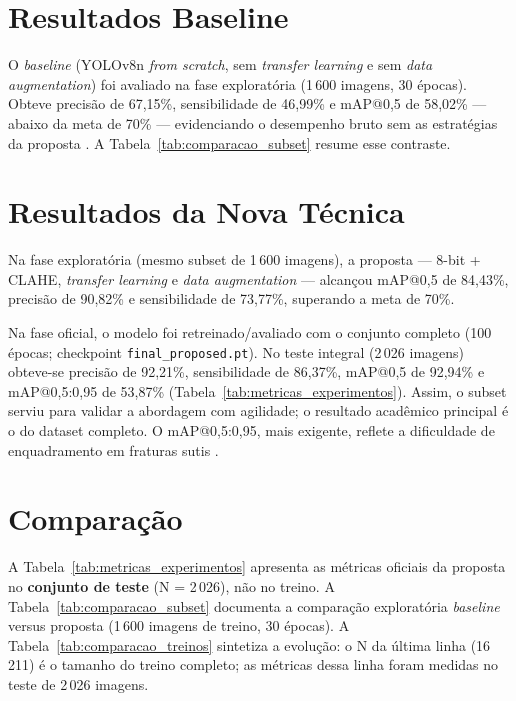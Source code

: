 \documentclass[12pt,oneside,a4paper,chapter=TITLE,section=TITLE,sumario=tradicional]{abntex2}
\begin{document}
\section{Resultados Baseline}
\label{sec:resultados_baseline}

O \textit{baseline} (YOLOv8n \textit{from scratch}, sem \textit{transfer learning} e sem \textit{data augmentation}) foi avaliado na fase exploratória (1\,600 imagens, 30 épocas). Obteve precisão de 67,15\%, sensibilidade de 46,99\% e mAP@0,5 de 58,02\% --- abaixo da meta de 70\% --- evidenciando o desempenho bruto sem as estratégias da proposta \cite{litjens2017survey,nagy2022grazpedwri}. A Tabela~\ref{tab:comparacao_subset} resume esse contraste.

\section{Resultados da Nova Técnica}
\label{sec:resultados_nova_tecnica}

Na fase exploratória (mesmo subset de 1\,600 imagens), a proposta --- 8-bit + CLAHE, \textit{transfer learning} e \textit{data augmentation} --- alcançou mAP@0,5 de 84,43\%, precisão de 90,82\% e sensibilidade de 73,77\%, superando a meta de 70\%.

Na fase oficial, o modelo foi retreinado/avaliado com o conjunto completo (100 épocas; checkpoint \texttt{final\_proposed.pt}). No teste integral (2\,026 imagens) obteve-se precisão de 92,21\%, sensibilidade de 86,37\%, mAP@0,5 de 92,94\% e mAP@0,5:0,95 de 53,87\% (Tabela~\ref{tab:metricas_experimentos}). Assim, o subset serviu para validar a abordagem com agilidade; o resultado acadêmico principal é o do dataset completo. O mAP@0,5:0,95, mais exigente, reflete a dificuldade de enquadramento em fraturas sutis \cite{lin2014coco,zhou2020}.

\section{Comparação}
\label{sec:comparacao}

A Tabela~\ref{tab:metricas_experimentos} apresenta as métricas oficiais da proposta no \textbf{conjunto de teste} (N = 2\,026), não no treino. A Tabela~\ref{tab:comparacao_subset} documenta a comparação exploratória \textit{baseline} versus proposta (1\,600 imagens de treino, 30 épocas). A Tabela~\ref{tab:comparacao_treinos} sintetiza a evolução: o N da última linha (16\,211) é o tamanho do treino completo; as métricas dessa linha foram medidas no teste de 2\,026 imagens.
\end{document}
